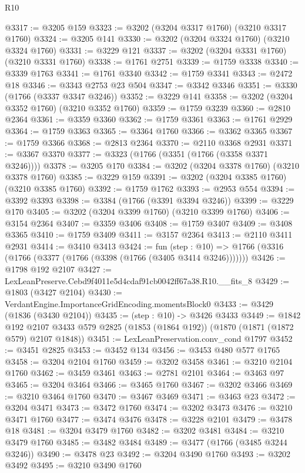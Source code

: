 \begin{lexlean}{R10}
\begin{coremodule}
@3317 := @3205 @159
@3323 := @3202 (@3204 @3317 @1760) (@3210 @3317 @1760)
@3324 := @3205 @141
@3330 := @3202 (@3204 @3324 @1760) (@3210 @3324 @1760)
@3331 := @3229 @121
@3337 := @3202 (@3204 @3331 @1760) (@3210 @3331 @1760)
@3338 := @1761 @2751
@3339 := @1759 @3338
@3340 := @3339 @1763
@3341 := @1761 @3340
@3342 := @1759 @3341
@3343 := @2472 @18
@3346 := @3343 @2753 @23 @504
@3347 := @3342 @3346
@3351 := @3330 (@1766 (@3337 @3347 @3246))
@3352 := @3229 @141
@3358 := @3202 (@3204 @3352 @1760) (@3210 @3352 @1760)
@3359 := @1759 @3239
@3360 := @2810 @2364
@3361 := @3359 @3360
@3362 := @1759 @3361
@3363 := @1761 @2929
@3364 := @1759 @3363
@3365 := @3364 @1760
@3366 := @3362 @3365
@3367 := @1759 @3366
@3368 := @2813 @2364
@3370 := @2110 @3368 @2931
@3371 := @3367 @3370
@3377 := @3323 (@1766 (@3351 (@1766 (@3358 @3371 @3246))))
@3378 := @3205 @170
@3384 := @3202 (@3204 @3378 @1760) (@3210 @3378 @1760)
@3385 := @3229 @159
@3391 := @3202 (@3204 @3385 @1760) (@3210 @3385 @1760)
@3392 := @1759 @1762
@3393 := @2953 @554
@3394 := @3392 @3393
@3398 := @3384 (@1766 (@3391 @3394 @3246))
@3399 := @3229 @170
@3405 := @3202 (@3204 @3399 @1760) (@3210 @3399 @1760)
@3406 := @3154 @2364
@3407 := @3359 @3406
@3408 := @1759 @3407
@3409 := @3408 @3365
@3410 := @1759 @3409
@3411 := @3157 @2364
@3413 := @2110 @3411 @2931
@3414 := @3410 @3413
@3424 := fun (step : @10) =>
  @1766 (@3316 (@1766 (@3377 (@1766 (@3398 (@1766 (@3405 @3414 @3246)))))))
@3426 := @1798 @192 @2107
@3427 := LexLeanPreserve.Cebd9f4011e5d4cdaf91cb0042ff67a38.R10.__fits_8
@3429 := @1803 (@3427 @2104)
@3430 := VerdantEngine.ImportanceGridEncoding.momentsBlock0
@3433 := @3429 (@1836 (@3430 @2104))
@3435 := (step : @10) -> @3426 @3433
@3449 := @1842
    @192
    @2107
    @3433
    @579
    @2825
    (@1853 (@1864 @192))
    (@1870 (@1871 (@1872 @579) @2107 @1848))
@3451 := LexLeanPreservation.conv_cond @1797
@3452 := @3451 @2825
@3453 := @3452 @134
@3456 := @3453 @480 @577 @1765
@3458 := @3204 @2104 @1760
@3459 := @3202 @3458
@3461 := @3210 @2104 @1760
@3462 := @3459 @3461
@3463 := @2781 @2101
@3464 := @3463 @97
@3465 := @3204 @3464
@3466 := @3465 @1760
@3467 := @3202 @3466
@3469 := @3210 @3464 @1760
@3470 := @3467 @3469
@3471 := @3463 @23
@3472 := @3204 @3471
@3473 := @3472 @1760
@3474 := @3202 @3473
@3476 := @3210 @3471 @1760
@3477 := @3474 @3476
@3478 := @3228 @2101
@3479 := @3478 @18
@3481 := @3204 @3479 @1760
@3482 := @3202 @3481
@3484 := @3210 @3479 @1760
@3485 := @3482 @3484
@3489 := @3477 (@1766 (@3485 @3244 @3246))
@3490 := @3478 @23
@3492 := @3204 @3490 @1760
@3493 := @3202 @3492
@3495 := @3210 @3490 @1760

\end{coremodule}
\end{lexlean}
